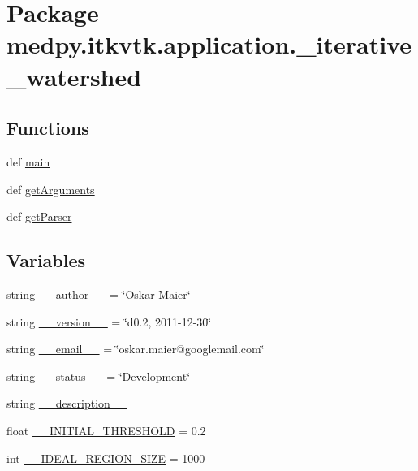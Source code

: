 \hypertarget{namespacemedpy_1_1itkvtk_1_1application_1_1__iterative__watershed}{
\section{Package medpy.itkvtk.application.\_\-iterative\_\-watershed}
\label{namespacemedpy_1_1itkvtk_1_1application_1_1__iterative__watershed}
}
\subsection*{Functions}
\begin{DoxyCompactItemize}
\item 
def \hyperlink{namespacemedpy_1_1itkvtk_1_1application_1_1__iterative__watershed_aa5be0c881f02c37cea6ce8aa2361712e}{main}
\item 
def \hyperlink{namespacemedpy_1_1itkvtk_1_1application_1_1__iterative__watershed_a2cb8d472c03d5876b5be67a72837c017}{getArguments}
\item 
def \hyperlink{namespacemedpy_1_1itkvtk_1_1application_1_1__iterative__watershed_a72ca0e8f9bb9e2f8ccfeb23ca2252cc9}{getParser}
\end{DoxyCompactItemize}
\subsection*{Variables}
\begin{DoxyCompactItemize}
\item 
string \hyperlink{namespacemedpy_1_1itkvtk_1_1application_1_1__iterative__watershed_a395d19efca7815b805ac3a16e17fdfa8}{\_\-\_\-author\_\-\_\-} = \char`\"{}Oskar Maier\char`\"{}
\item 
string \hyperlink{namespacemedpy_1_1itkvtk_1_1application_1_1__iterative__watershed_a1c83959b9e890db3e8d7744132b67de8}{\_\-\_\-version\_\-\_\-} = \char`\"{}d0.2, 2011-\/12-\/30\char`\"{}
\item 
string \hyperlink{namespacemedpy_1_1itkvtk_1_1application_1_1__iterative__watershed_a4e6ae8a43a52d490b94e1716b9dc645e}{\_\-\_\-email\_\-\_\-} = \char`\"{}oskar.maier@googlemail.com\char`\"{}
\item 
string \hyperlink{namespacemedpy_1_1itkvtk_1_1application_1_1__iterative__watershed_ab1fe6e799c957d8a6870689070c9da69}{\_\-\_\-status\_\-\_\-} = \char`\"{}Development\char`\"{}
\item 
string \hyperlink{namespacemedpy_1_1itkvtk_1_1application_1_1__iterative__watershed_ae350c881760491ef3857bdce50a503ae}{\_\-\_\-description\_\-\_\-}
\item 
float \hyperlink{namespacemedpy_1_1itkvtk_1_1application_1_1__iterative__watershed_a129400336f58040c1f911269607edb52}{\_\-\_\-INITIAL\_\-THRESHOLD} = 0.2
\item 
int \hyperlink{namespacemedpy_1_1itkvtk_1_1application_1_1__iterative__watershed_a15d17709c22dfc1b95cfe8f82e541713}{\_\-\_\-IDEAL\_\-REGION\_\-SIZE} = 1000
\end{DoxyCompactItemize}


